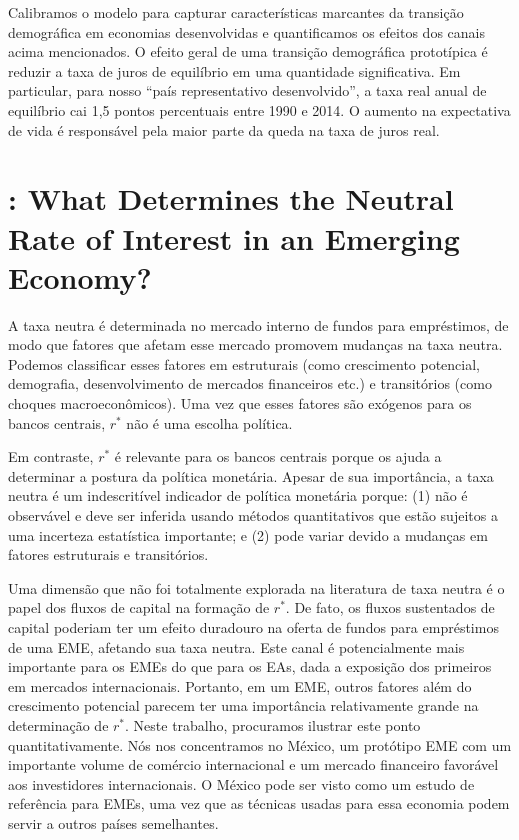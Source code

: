 \documentclass[11pt,oneside,a4paper]{article}
\begin{document}
Calibramos o modelo para capturar características marcantes da transição demográfica em economias desenvolvidas e quantificamos os efeitos dos canais acima mencionados. O efeito geral de uma transição demográfica prototípica é reduzir a taxa de juros de equilíbrio em uma quantidade significativa. Em particular, para nosso “país representativo desenvolvido”, a taxa real anual de equilíbrio cai 1,5 pontos percentuais entre 1990 e 2014. O aumento na expectativa de vida é responsável pela maior parte da queda na taxa de juros real.
%
%
\section{\citet{Carrillo:2018}: What Determines the Neutral Rate of Interest in an
Emerging Economy? }

A taxa neutra é determinada no mercado interno de fundos para empréstimos, de modo que fatores que afetam esse mercado promovem mudanças na taxa neutra. Podemos classificar esses fatores em estruturais (como crescimento potencial, demografia, desenvolvimento de mercados financeiros etc.) e transitórios (como choques macroeconômicos). Uma vez que esses fatores são exógenos para os bancos centrais, $r^{*}$ não é uma escolha política.

Em contraste, $r^{*}$ é relevante para os bancos centrais porque os ajuda a determinar a postura da política monetária. Apesar de sua importância, a taxa neutra é um indescritível indicador de política monetária porque: (1) não é observável e deve ser inferida usando métodos quantitativos que estão sujeitos a uma incerteza estatística importante; e (2) pode variar devido a mudanças em fatores estruturais e transitórios.

Uma dimensão que não foi totalmente explorada na literatura de taxa neutra é o papel dos fluxos de capital na formação de $r^{*}$. De fato, os fluxos sustentados de capital poderiam ter um efeito duradouro na oferta de fundos para empréstimos de uma EME, afetando sua taxa neutra. Este canal é potencialmente mais importante para os EMEs do que para os EAs, dada a exposição dos primeiros em mercados internacionais. Portanto, em um EME, outros fatores além do crescimento potencial parecem ter uma importância relativamente grande na determinação de $r^{*}$. Neste trabalho, procuramos ilustrar este ponto quantitativamente. Nós nos concentramos no México, um protótipo EME com um importante volume de comércio internacional e um mercado financeiro favorável aos investidores internacionais. O México pode ser visto como um estudo de referência para EMEs, uma vez que as técnicas usadas para essa economia podem servir a outros países semelhantes.
\end{document}
